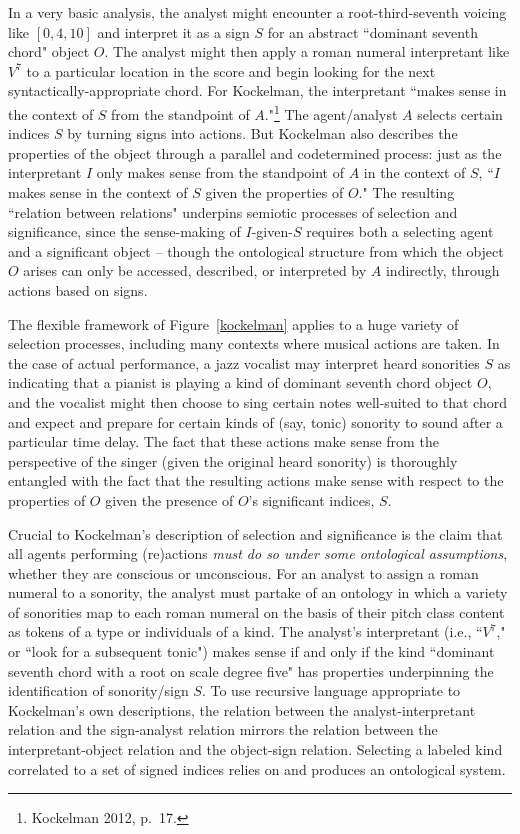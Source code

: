 In a very basic analysis, the analyst might encounter a root-third-seventh voicing like $[0,4,10]$ and interpret it as a sign $S$ for an abstract ``dominant seventh chord" object $O$.  The analyst might then apply a roman numeral interpretant like $V^7$ to a particular location in the score and begin looking for the next syntactically-appropriate chord.  For Kockelman, the interpretant ``makes sense in the context of $S$ from the standpoint of $A$."\footnote{Kockelman 2012, p.\ 17.}  The agent/analyst $A$ selects certain indices $S$ by turning signs into actions.  But Kockelman also describes the properties of the object through a parallel and codetermined process: just as the interpretant $I$ only makes sense from the standpoint of $A$ in the context of $S$, ``$I$ makes sense in the context of $S$ given the properties of $O$."  The resulting ``relation between relations" underpins semiotic processes of selection and significance, since the sense-making of $I$-given-$S$ requires both a selecting agent and a significant object -- though the ontological structure from which the object $O$ arises can only be accessed, described, or interpreted by $A$ indirectly, through actions based on signs.

The flexible framework of Figure~\ref{kockelman} applies to a huge variety of selection processes, including many contexts where musical actions are taken.  In the case of actual performance, a jazz vocalist may interpret heard sonorities $S$ as indicating that a pianist is playing a kind of dominant seventh chord object $O$, and the vocalist might then choose to sing certain notes well-suited to that chord and expect and prepare for certain kinds of (say, tonic) sonority to sound after a particular time delay.  The fact that these actions make sense from the perspective of the singer (given the original heard sonority) is thoroughly entangled with the fact that the resulting actions make sense with respect to the properties of $O$ given the presence of $O$'s significant indices, $S$.

Crucial to Kockelman's description of selection and significance is the claim that all agents performing (re)actions \emph{must do so under some ontological assumptions}, whether they are conscious or unconscious.  For an analyst to assign a roman numeral to a sonority, the analyst must partake of an ontology in which a variety of sonorities map to each roman numeral on the basis of their pitch class content as tokens of a type or individuals of a kind.  The analyst's interpretant (i.e., ``$V^7$," or ``look for a subsequent tonic") makes sense if and only if the kind ``dominant seventh chord with a root on scale degree five" has properties underpinning the identification of sonority/sign $S$. To use recursive language appropriate to Kockelman's own descriptions, the relation between the analyst-interpretant relation and the sign-analyst relation mirrors the relation between the interpretant-object relation and the object-sign relation.  Selecting a labeled kind correlated to a set of signed indices relies on and produces an ontological system.

